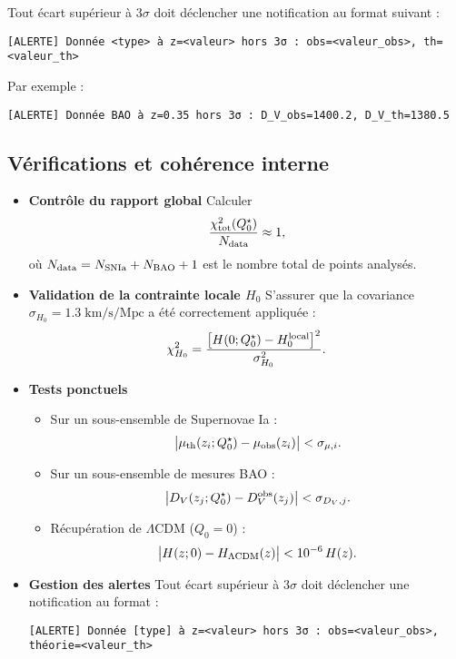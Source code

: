 Tout écart supérieur à \(3\sigma\) doit déclencher une notification au format suivant :

\begin{verbatim}
[ALERTE] Donnée <type> à z=<valeur> hors 3σ : obs=<valeur_obs>, th=<valeur_th>
\end{verbatim}

Par exemple :

\begin{verbatim}
[ALERTE] Donnée BAO à z=0.35 hors 3σ : D_V_obs=1400.2, D_V_th=1380.5
\end{verbatim}

\subsection{Vérifications et cohérence interne}

\begin{itemize}
  \item \textbf{Contrôle du rapport global}
    Calculer
    \[
      \frac{\chi^{2}_{\rm tot}(Q_{0}^{\star})}{N_{\rm data}}
      \approx 1,
    \]
    où \(N_{\rm data} = N_{\rm SNIa} + N_{\rm BAO} + 1\) est le nombre total de points analysés.

  \item \textbf{Validation de la contrainte locale \(H_{0}\)}
    S’assurer que la covariance \(\sigma_{H_{0}} = 1.3\;\mathrm{km/s/Mpc}\) a été correctement appliquée :
    \[
      \chi^{2}_{H_{0}}
      = \frac{\bigl[H(0;Q_{0}^{\star}) - H_{0}^{\rm local}\bigr]^{2}}
             {\sigma_{H_{0}}^{2}}.
    \]

  \item \textbf{Tests ponctuels}
    \begin{itemize}
      \item Sur un sous-ensemble de Supernovae Ia :
        \[
          \bigl|\mu_{\rm th}(z_i;Q_{0}^{\star}) - \mu_{\rm obs}(z_i)\bigr|
          < \sigma_{\mu,i}.
        \]
      \item Sur un sous-ensemble de mesures BAO :
        \[
          \bigl|D_{V}(z_j;Q_{0}^{\star}) - D_{V}^{\rm obs}(z_j)\bigr|
          < \sigma_{D_{V},j}.
        \]
      \item Récupération de \(\Lambda\)CDM (\(Q_{0}=0\)) :
        \[
          \bigl|H(z;0) - H_{\Lambda\rm CDM}(z)\bigr|
          < 10^{-6}\,H(z).
        \]
    \end{itemize}

  \item \textbf{Gestion des alertes}
    Tout écart supérieur à \(3\sigma\) doit déclencher une notification au format :
    \begin{verbatim}
[ALERTE] Donnée [type] à z=<valeur> hors 3σ : obs=<valeur_obs>, théorie=<valeur_th>
    \end{verbatim}
\end{itemize}

